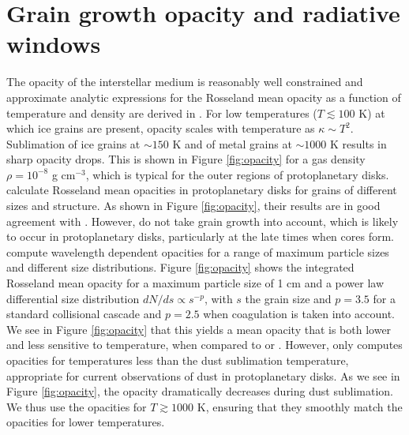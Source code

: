 \chapter{Grain growth opacity and radiative windows} \label{radwindow}

The opacity of the interstellar medium is reasonably well constrained and approximate analytic expressions for the Rosseland mean opacity as a function of temperature and density are derived in \citet{bell94}. For low temperatures ($T \lesssim 100$ K) at which ice grains are present, opacity scales with temperature as $\kappa \sim T^2$. Sublimation of ice grains at $\sim$$150$ K and of metal grains at $\sim$$1000$ K results in sharp opacity drops. This is shown in Figure \ref{fig:opacity} for a gas density $\rho=10^{-8}$ g cm$^{-3}$, which is typical for the outer regions of protoplanetary disks. \citet{semenov03} calculate Rosseland mean opacities in protoplanetary disks for grains of different sizes and structure. As shown in Figure \ref{fig:opacity}, their results are in good agreement with \citet{bell94}. However, \citet{semenov03} do not take grain growth into account, which is likely to occur in protoplanetary disks, particularly at the late times when cores form. \citet{dalessio01} compute wavelength dependent opacities for a range of maximum particle sizes and different size distributions. Figure \ref{fig:opacity} shows the integrated Rosseland mean opacity for a maximum particle size of 1 cm and a power law differential size distribution $dN/ds \propto s^{-p}$, with $s$ the grain size and $p=3.5$ for a standard collisional cascade and $p=2.5$ when coagulation is taken into account. We see in Figure \ref{fig:opacity} that this yields a mean opacity that is both lower and less sensitive to temperature, when compared to \citet{bell94} or \citet{semenov03}. However, \citet{dalessio01} only computes opacities for temperatures less than the dust sublimation temperature, appropriate for current observations of dust in protoplanetary disks. As we see in Figure \ref{fig:opacity}, the opacity dramatically decreases during dust sublimation. We thus use the \citet{bell94} opacities for $T \gtrsim 1000$ K, ensuring that they smoothly match the \citet{dalessio01} opacities for lower temperatures.

